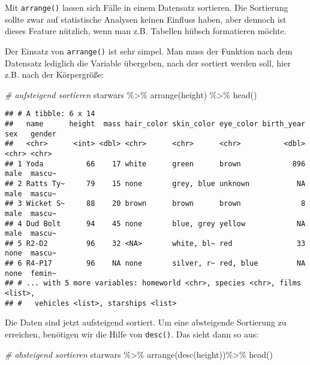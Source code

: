 \documentclass[
]{book}
\newenvironment{Shaded}{\begin{snugshade}}{\end{snugshade}}
\newcommand{\CommentTok}[1]{\textcolor[rgb]{0.56,0.35,0.01}{\textit{#1}}}
\newcommand{\FunctionTok}[1]{\textcolor[rgb]{0.00,0.00,0.00}{#1}}
\newcommand{\NormalTok}[1]{#1}
\newcommand{\SpecialCharTok}[1]{\textcolor[rgb]{0.00,0.00,0.00}{#1}}
\begin{document}
Mit \texttt{arrange()} lassen sich Fälle in einem Datensatz sortieren. Die Sortierung sollte zwar auf statistische Analysen keinen Einfluss haben, aber dennoch ist dieses Feature nützlich, wenn man z.B. Tabellen hübsch formatieren möchte.

Der Einsatz von \texttt{arrange()} ist sehr simpel. Man muss der Funktion nach dem Datensatz lediglich die Variable übergeben, nach der sortiert werden soll, hier z.B. nach der Körpergröße:

\begin{Shaded}
\begin{Highlighting}[]
\CommentTok{\# aufsteigend sortieren}
\NormalTok{starwars }\SpecialCharTok{\%\textgreater{}\%} 
  \FunctionTok{arrange}\NormalTok{(height) }\SpecialCharTok{\%\textgreater{}\%} 
  \FunctionTok{head}\NormalTok{()}
\end{Highlighting}
\end{Shaded}

\begin{verbatim}
## # A tibble: 6 x 14
##   name      height  mass hair_color skin_color eye_color birth_year sex   gender
##   <chr>      <int> <dbl> <chr>      <chr>      <chr>          <dbl> <chr> <chr> 
## 1 Yoda          66    17 white      green      brown            896 male  mascu~
## 2 Ratts Ty~     79    15 none       grey, blue unknown           NA male  mascu~
## 3 Wicket S~     88    20 brown      brown      brown              8 male  mascu~
## 4 Dud Bolt      94    45 none       blue, grey yellow            NA male  mascu~
## 5 R2-D2         96    32 <NA>       white, bl~ red               33 none  mascu~
## 6 R4-P17        96    NA none       silver, r~ red, blue         NA none  femin~
## # ... with 5 more variables: homeworld <chr>, species <chr>, films <list>,
## #   vehicles <list>, starships <list>
\end{verbatim}

Die Daten sind jetzt aufsteigend sortiert. Um eine absteigende Sortierung zu erreichen, benötigen wir die Hilfe von \texttt{desc()}. Das sieht dann so aus:

\begin{Shaded}
\begin{Highlighting}[]
\CommentTok{\# absteigend sortieren}
\NormalTok{starwars }\SpecialCharTok{\%\textgreater{}\%} 
  \FunctionTok{arrange}\NormalTok{(}\FunctionTok{desc}\NormalTok{(height))}\SpecialCharTok{\%\textgreater{}\%} 
  \FunctionTok{head}\NormalTok{()}
\end{Highlighting}
\end{Shaded}
\end{document}
